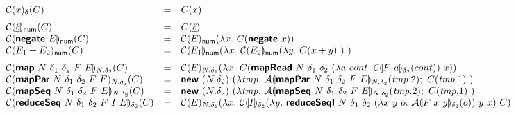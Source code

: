 \begin{figure}[H]
  \begin{displaymath}
    \begin{array}{lcl}
      \semE{x}_\delta(C)
      &=& C(x)
      \medskip\\
      \semE{\underline{\ell}}_{\num}(C)
      &=& C(\underline{\ell})
      \\
      \semE{\prim{negate}~E}_{\num}(C)
      &=& \semE{E}_{\num}(\lambda x.~C(\prim{negate}~x))
      \\
      \semE{E_1 + E_2}_{\num}(C)
      &=& \semE{E_1}_{\num}(\lambda x.~\semE{E_2}_{\num}(\lambda y.~C(x+y)~)~)
      \medskip\\

      \semE{\prim{map}~N~\delta_1~\delta_2~F~E}_{N.\delta_2}(C)
      &=& \semE{E}_{N.\delta_1}(\lambda x.~C(\prim{mapRead}~N~\delta_1~\delta_2~(\lambda a~cont.~\semE{F~a}_{\delta_2}(cont))~x))
      \\
      \semE{\prim{mapPar}~N~\delta_1~\delta_2~F~E}_{N.\delta_2}(C)
      &=& \prim{new}~(N.\delta_2)~(\lambda \mathit{tmp}.~\semA{\prim{mapPar}~N~\delta_1~\delta_2~F~E}_{N.\delta_2}(\mathit{tmp}.2);~C(\mathit{tmp}.1)~)
      \\
      \semE{\prim{mapSeq}~N~\delta_1~\delta_2~F~E}_{N.\delta_2}(C)
      &=& \prim{new}~(N.\delta_2)~(\lambda \mathit{tmp}.~\semA{\prim{mapSeq}~N~\delta_1~\delta_2~F~E}_{N.\delta_2}(\mathit{tmp}.2);~C(\mathit{tmp}.1)~)
      \\
      \semE{\prim{reduceSeq}~N~\delta_1~\delta_2~F~I~E}_{\delta_2}(C)
      &=& \begin{array}[t]{@{}l}
            \semE{E}_{N.\delta_1}(\lambda x.~
            \semE{I}_{\delta_2}(\lambda y.~\prim{reduceSeqI}~N~\delta_1~\delta_2~(\lambda x~y~o.~\semA{F~x~y}_{\delta_2}(o))~y~x)~C)
          \end{array}
      \medskip\\


\end{array}
\end{displaymath}
\end{figure}
